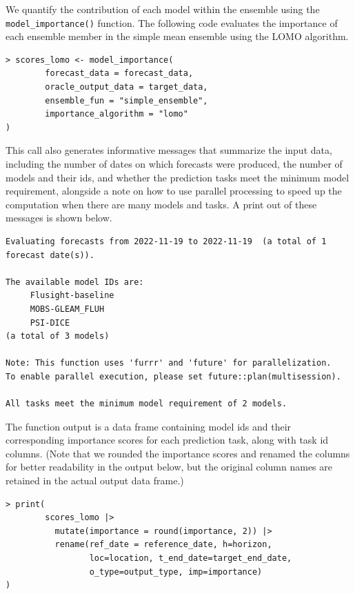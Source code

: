 \documentclass[
  article,
  shortnames,
  notitle]{jss}
\begin{document}
We quantify the contribution of each model within the ensemble using the
\texttt{model\_importance()} function. The following code evaluates the
importance of each ensemble member in the simple mean ensemble using the
LOMO algorithm.

\begin{verbatim}
> scores_lomo <- model_importance(
        forecast_data = forecast_data,
        oracle_output_data = target_data,
        ensemble_fun = "simple_ensemble",
        importance_algorithm = "lomo"
)
\end{verbatim}

This call also generates informative messages that summarize the input
data, including the number of dates on which forecasts were produced,
the number of models and their ids, and whether the prediction tasks
meet the minimum model requirement, alongside a note on how to use
parallel processing to speed up the computation when there are many
models and tasks. A print out of these messages is shown below.

\small

\begin{verbatim}
Evaluating forecasts from 2022-11-19 to 2022-11-19  (a total of 1 forecast date(s)).

The available model IDs are:
     Flusight-baseline
     MOBS-GLEAM_FLUH
     PSI-DICE 
(a total of 3 models)

Note: This function uses 'furrr' and 'future' for parallelization.
To enable parallel execution, please set future::plan(multisession).

All tasks meet the minimum model requirement of 2 models.
\end{verbatim}

\vspace{0.35cm} 
\normalsize

The function output is a data frame containing model ids and their
corresponding importance scores for each prediction task, along with
task id columns. (Note that we rounded the importance scores and renamed
the columns for better readability in the output below, but the original
column names are retained in the actual output data frame.)

\begin{verbatim}
> print(
        scores_lomo |> 
          mutate(importance = round(importance, 2)) |>
          rename(ref_date = reference_date, h=horizon, 
                 loc=location, t_end_date=target_end_date, 
                 o_type=output_type, imp=importance)
)
\end{verbatim}
\end{document}
